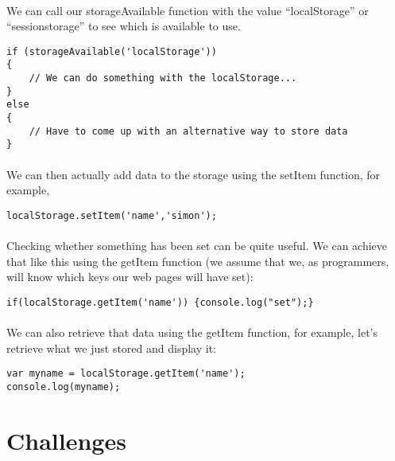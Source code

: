 \documentclass[10pt, a4paper, twosize]{article}
\begin{document}
\paragraph{} We can call our storageAvailable function with the value ``localStorage'' or ``sessionstorage'' to see which is available to use.
\begin{lstlisting}
if (storageAvailable('localStorage'))
{
    // We can do something with the localStorage...
}
else 
{
    // Have to come up with an alternative way to store data
}
\end{lstlisting}

\paragraph{} We can then actually add data to the storage using the setItem function, for example,
\begin{lstlisting}
localStorage.setItem('name','simon');
\end{lstlisting}
\paragraph{} Checking whether something has been set can be quite useful. We can achieve that like this using the getItem function (we assume that we, as programmers, will know which keys our web pages will have set):

\begin{lstlisting}
if(localStorage.getItem('name')) {console.log("set");}
\end{lstlisting}

\paragraph{} We can also retrieve that data using the getItem function, for example, let's retrieve what we just stored and display it:
\begin{lstlisting}
var myname = localStorage.getItem('name');
console.log(myname);
\end{lstlisting}
\paragraph{}



\section{Challenges}
\end{document}
